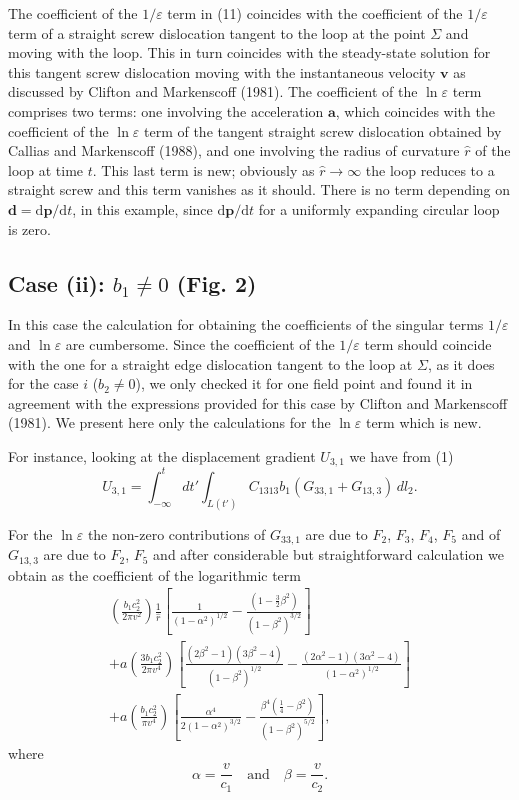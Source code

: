 \documentclass[12pt]{article}
\begin{document}
The coefficient of the $1/\varepsilon$ term in (11) coincides with the coefficient of the $1/\varepsilon$ term of a straight screw dislocation tangent to the loop at the point $\Sigma$ and moving with the loop. This in turn coincides with the steady-state solution for this tangent screw dislocation moving with the instantaneous velocity $\mathbf{v}$ as discussed by Clifton and Markenscoff (1981). The coefficient of the $\ln\varepsilon$ term comprises two terms: one involving the acceleration $\mathbf{a}$, which coincides with the coefficient of the $\ln\varepsilon$ term of the tangent straight screw dislocation obtained by Callias and Markenscoff (1988), and one involving the radius of curvature $\hat{r}$ of the loop at time $t$. This last term is new; obviously as $\hat{r}\to\infty$ the loop reduces to a straight screw and this term vanishes as it should. There is no term depending on $\mathbf{d}=\mathrm{d}\mathbf{p}/\mathrm{d}t$, in this example, since $\mathrm{d}\mathbf{p}/\mathrm{d}t$ for a uniformly expanding circular loop is zero.

\subsection*{Case (ii): $b_1 \neq 0$ (Fig. 2)}

In this case the calculation for obtaining the coefficients of the singular terms $1/\varepsilon$ and $\ln\varepsilon$ are cumbersome. Since the coefficient of the $1/\varepsilon$ term should coincide with the one for a straight edge dislocation tangent to the loop at $\Sigma$, as it does for the case $i$ ($b_2\neq 0$), we only checked it for one field point and found it in agreement with the expressions provided for this case by Clifton and Markenscoff (1981). We present here only the calculations for the $\ln\varepsilon$ term which is new.

For instance, looking at the displacement gradient $U_{3,1}$ we have from (1)
\[
U_{3,1} = \int_{-\infty}^{t}dt'\int_{L(t')} C_{1313}b_1(G_{33,1}+G_{13,3})\,dl_2.
\]

For the $\ln\varepsilon$ the non-zero contributions of $G_{33,1}$ are due to $F_2$, $F_3$, $F_4$, $F_5$ and of $G_{13,3}$ are due to $F_2$, $F_5$ and after considerable but straightforward calculation we obtain as the coefficient of the logarithmic term
\begin{multline*}
\left(\frac{b_1 c_2^2}{2\pi v^2}\right)\frac{1}{\hat{r}}\left[\frac{1}{(1-\alpha^2)^{1/2}} - \frac{(1-\frac{3}{2}\beta^2)}{(1-\beta^2)^{3/2}}\right] \\
+ a\left(\frac{3b_1 c_2^2}{2\pi v^4}\right)\left[\frac{(2\beta^2-1)(3\beta^2-4)}{(1-\beta^2)^{1/2}} - \frac{(2\alpha^2-1)(3\alpha^2-4)}{(1-\alpha^2)^{1/2}}\right] \\
+ a\left(\frac{b_1 c_2^2}{\pi v^4}\right)\left[\frac{\alpha^4}{2(1-\alpha^2)^{3/2}} - \frac{\beta^4(\frac{1}{4}-\beta^2)}{(1-\beta^2)^{5/2}}\right],
\end{multline*}
where
\[
\alpha = \frac{v}{c_1} \quad \text{and} \quad \beta = \frac{v}{c_2}.
\]
\end{document}
